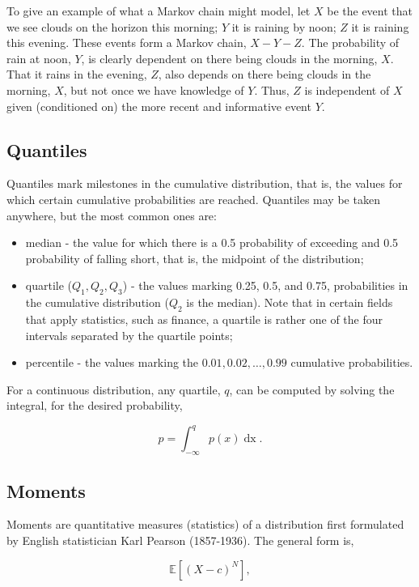 \documentclass[11pt]{amsart}
\begin{document}
To give an example of what a Markov chain might model, let $X$ be the event that we see clouds on the horizon this morning; $Y$ it is raining by noon; $Z$ it is raining this evening. These events form a Markov chain, $X-Y-Z$. The probability of rain at noon, $Y$, is clearly dependent on there being clouds in the morning, $X$. That it rains in the evening, $Z$, also depends on there being clouds in the morning, $X$, but not once we have knowledge of $Y$. Thus, $Z$ is independent of $X$ given (conditioned on) the more recent and informative event $Y$.

\subsection{Quantiles}

Quantiles mark milestones in the cumulative distribution, that is, the values for which certain cumulative probabilities are reached. Quantiles may be taken anywhere, but the most common ones are:

\begin{itemize}
\item median - the value for which there is a 0.5 probability of exceeding and 0.5 probability of falling short, that is, the midpoint of the distribution;
\item quartile ($Q_1, Q_2, Q_3$) - the values marking 0.25, 0.5, and 0.75, probabilities in the cumulative distribution ($Q_2$ is the median). Note that in certain fields that apply statistics, such as finance, a quartile is rather one of the four intervals separated by the quartile points;
\item percentile - the values marking the $0.01, 0.02, \dots, 0.99$ cumulative probabilities.
\end{itemize}

For a continuous distribution, any quartile, $q$, can be computed by solving the integral, for the desired probability,

$$
p = \int_{-\infty}^{q} p(x) \mathop{dx}.
$$


\subsection{Moments}

Moments are quantitative measures (statistics) of a distribution first formulated by English statistician Karl Pearson (1857-1936). The general form is,

$$
\mathbb{E}[(X - c)^N],
$$
\end{document}
